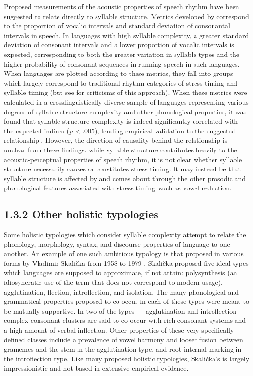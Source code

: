   Proposed measurements of the acoustic properties of speech rhythm have been suggested to relate directly to syllable structure. Metrics developed by \citet{RamusEtAl1999} correspond to the proportion of vocalic intervals and standard deviation of consonantal intervals in speech. In languages with high syllable complexity, a greater standard deviation of consonant intervals and a lower proportion of vocalic intervals is expected, corresponding to both the greater variation in syllable types and the higher probability of consonant sequences in running speech in such languages. When languages are plotted according to these metrics, they fall into groups which largely correspond to traditional rhythm categories of stress timing and syllable timing (but see \citealt{WigetEtAl2010} for criticisms of this approach). When these metrics were calculated in a crosslinguistically diverse sample of languages representing various degrees of syllable structure complexity and other phonological properties, it was found that syllable structure complexity is indeed significantly correlated with the expected indices (\textit{p} < .005), lending empirical validation to the suggested relationship \citep{EasterdayEtAl2011}. However, the direction of causality behind the relationship is unclear from these findings: while syllable structure contributes heavily to the acoustic-perceptual properties of speech rhythm, it is not clear whether syllable structure necessarily causes or constitutes stress timing. It may instead be that syllable structure is affected by and comes about through the other prosodic and phonological features associated with stress timing, such as vowel reduction.


\subsection{1.3.2 Other holistic typologies}

\textsf{} Some holistic typologies which consider syllable complexity attempt to relate the phonology, morphology, syntax, and discourse properties of language to one another. An example of one such ambitious typology is that proposed in various forms by Vladimir Skalička from 1958 to 1979 \citep{Plank1998}. Skalička  proposed five ideal types which languages are supposed to approximate, if not attain: polysynthesis (an idiosyncratic use of the term that does not correspond to modern usage), agglutination, flection, introflection, and isolation. The many phonological and grammatical properties proposed to co-occur in each of these types were meant to be mutually supportive. In two of the types — agglutination and introflection — complex consonant clusters are said to co-occur with rich consonant systems and a high amount of verbal inflection. Other properties of these very specifically-defined classes include a prevalence of vowel harmony and looser fusion between gramemes and the stem in the agglutination type, and root-internal marking in the introflection type. Like many proposed holistic typologies, Skalička’s is largely impressionistic and not based in extensive empirical evidence.



